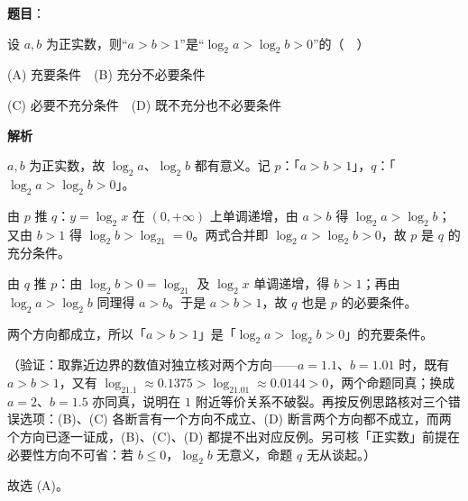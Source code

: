\begin{answer}

\textbf{题目}：

设 \(a,b\) 为正实数，则“\(a>b>1\)”是“\(\log_2 a>\log_2 b>0\)”的（　）

(A) 充要条件　(B) 充分不必要条件

(C) 必要不充分条件　(D) 既不充分也不必要条件

\textbf{解析}

\(a,b\) 为正实数，故 \(\log_2a\)、\(\log_2b\) 都有意义。记 \(p\)：「\(a>b>1\)」，\(q\)：「\(\log_2a>\log_2b>0\)」。

由 \(p\) 推 \(q\)：\(y=\log_2x\) 在 \((0,+\infty)\) 上单调递增，由 \(a>b\) 得 \(\log_2a>\log_2b\)；又由 \(b>1\) 得 \(\log_2b>\log_21=0\)。两式合并即 \(\log_2a>\log_2b>0\)，故 \(p\) 是 \(q\) 的充分条件。

由 \(q\) 推 \(p\)：由 \(\log_2b>0=\log_21\) 及 \(\log_2x\) 单调递增，得 \(b>1\)；再由 \(\log_2a>\log_2b\) 同理得 \(a>b\)。于是 \(a>b>1\)，故 \(q\) 也是 \(p\) 的必要条件。

两个方向都成立，所以「\(a>b>1\)」是「\(\log_2a>\log_2b>0\)」的充要条件。

（验证：取靠近边界的数值对独立核对两个方向——\(a=1.1\)、\(b=1.01\) 时，既有 \(a>b>1\)，又有 \(\log_21.1\approx0.1375>\log_21.01\approx0.0144>0\)，两个命题同真；换成 \(a=2\)、\(b=1.5\) 亦同真，说明在 \(1\) 附近等价关系不破裂。再按反例思路核对三个错误选项：(B)、(C) 各断言有一个方向不成立、(D) 断言两个方向都不成立，而两个方向已逐一证成，(B)、(C)、(D) 都提不出对应反例。另可核「正实数」前提在必要性方向不可省：若 \(b\leqslant0\)，\(\log_2b\) 无意义，命题 \(q\) 无从谈起。）

故选 (A)。


\end{answer}
